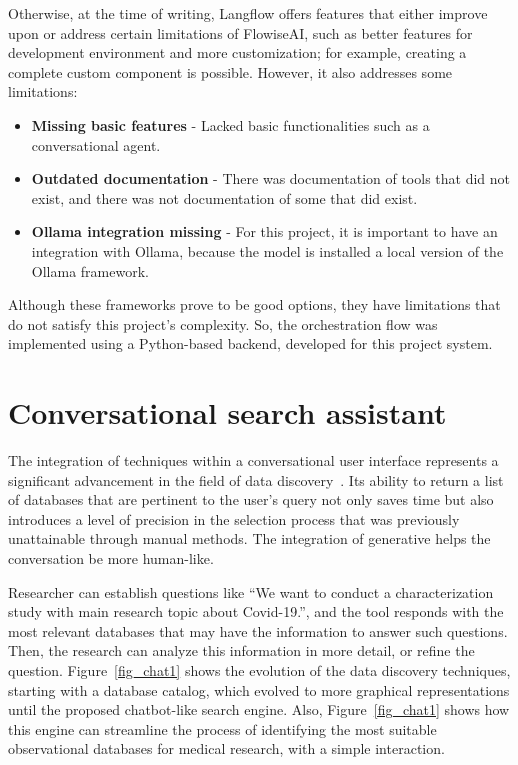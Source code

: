 Otherwise, at the time of writing, Langflow offers features that either improve upon or address certain limitations of FlowiseAI, such as better features for development environment and more customization; for example, creating a complete custom component is possible. However, it also addresses some limitations:

\begin{itemize}
	\item \textbf{Missing basic features} - Lacked basic functionalities such as a conversational agent.
	\item \textbf{Outdated documentation} - There was documentation of tools that did not exist, and there was not documentation of some that did exist. 
	\item \textbf{Ollama integration missing} - For this project, it is important to have an integration with Ollama, because the {\llm} model is installed a local version of the Ollama framework.
\end{itemize}


Although these frameworks prove to be good options, they have limitations that do not satisfy this project's complexity. So, the {\llm} orchestration flow was implemented using a Python-based backend, developed for this project system.


\section{Conversational search assistant}

The integration of {\ir} techniques within a conversational user interface represents a significant advancement in the field of data discovery~\cite{ritzel2019development}. Its ability to return a list of databases that are pertinent to the user's query not only saves time but also introduces a level of precision in the selection process that was previously unattainable through manual methods. The integration of generative {\ai} helps the conversation be more human-like. %

Researcher can establish questions like ``We want to conduct a characterization study with main research topic about Covid-19.'', and the tool responds with the most relevant databases that may have the information to answer such questions. Then, the research can analyze this information in more detail, or refine the question. Figure~\ref{fig_chat1} shows the evolution of the data discovery techniques, starting with a database catalog, which evolved to more graphical representations until the proposed chatbot-like search engine. Also, Figure~\ref{fig_chat1} shows how this engine can streamline the process of identifying the most suitable observational databases for medical research, with a simple interaction.


